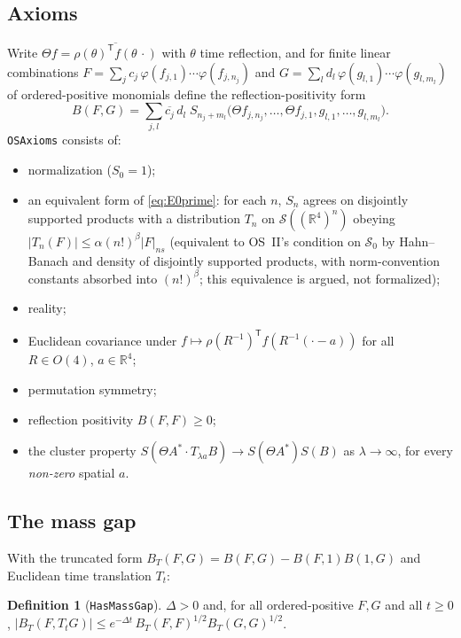 \documentclass[11pt]{article}
\theoremstyle{definition}
\newtheorem{definition}[proposition]{Definition}
\theoremstyle{remark}
\newcommand{\R}{\mathbb{R}}
\newcommand{\Sch}{\mathcal{S}}
\newcommand{\lean}[1]{\texttt{\hyphenchar\font=-1\relax #1}}
\begin{document}
\subsection{Axioms}
Write $\Theta f=\overline{\rho(\theta)^{\mathsf T}f(\theta\,\cdot)}$ with $\theta$ time reflection, and for
finite linear combinations $F=\sum_j c_j\,\varphi(f_{j,1})\cdots\varphi(f_{j,n_j})$ and
$G=\sum_l d_l\,\varphi(g_{l,1})\cdots\varphi(g_{l,m_l})$ of ordered-positive monomials define the
reflection-positivity form
\[
B(F,G)=\sum_{j,l}\overline{c_j}\,d_l\;S_{n_j+m_l}\big(\Theta f_{j,n_j},\dots,\Theta f_{j,1},
g_{l,1},\dots,g_{l,m_l}\big).
\]
\lean{OSAxioms} consists of:
\begin{itemize}[leftmargin=*]
\item normalization ($S_0=1$);
\item an equivalent form of \eqref{eq:E0prime}: for each $n$, $S_n$ agrees on disjointly supported
  products with a distribution $T_n$ on $\Sch((\R^4)^n)$ obeying
  $|T_n(F)|\le\alpha(n!)^\beta|F|_{ns}$ (equivalent to OS~II's condition on $\Sch_0$ by
  Hahn--Banach and density of disjointly supported products, with norm-convention constants
  absorbed into $(n!)^\beta$; this equivalence is argued, not formalized);
\item reality;
\item Euclidean covariance under $f\mapsto\rho(R^{-1})^{\mathsf T}f(R^{-1}(\cdot-a))$ for all
  $R\in O(4)$, $a\in\R^4$;
\item permutation symmetry;
\item reflection positivity $B(F,F)\ge0$;
\item the cluster property
  $S(\Theta A^*\cdot T_{\lambda a}B)\to S(\Theta A^*)S(B)$ as $\lambda\to\infty$, for every
  \emph{non-zero} spatial $a$.
\end{itemize}

\subsection{The mass gap}
With the truncated form $B_T(F,G)=B(F,G)-B(F,1)B(1,G)$ and Euclidean time translation $T_t$:

\begin{definition}[\lean{HasMassGap}]
$\Delta>0$ and, for all ordered-positive $F,G$ and all $t\ge0$,
$|B_T(F,T_tG)|\le e^{-\Delta t}\,B_T(F,F)^{1/2}B_T(G,G)^{1/2}$.
\end{definition}
\end{document}
